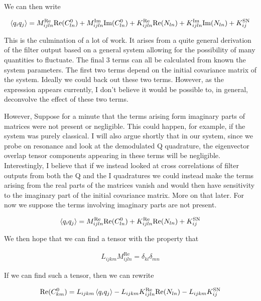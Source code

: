 \documentclass[12pt]{article}
\begin{document}
We can then write

\begin{align}
\Braket{q_iq_j} = M^{\text{Re}}_{ijln} \text{Re}(C^0_{ln}) + M^{\text{Im}}_{ijln} \text{Im}(C^0_{ln}) + K^{\text{Re}}_{ijln} \text{Re}(N_{ln}) + K^{\text{Im}}_{ijln} \text{Im}(N_{ln}) + K^{\text{SN}}_{ij}
\end{align}

This is the culmination of a lot of work. It arises from a quite general derivation of the filter output based on a general system allowing for the possibility of many quantities to fluctuate. The final 3 terms can all be calculated from known the system parameters. The first two terms depend on the initial covariance matrix of the system. Ideally we could back out these two terms. However, as the expression appears currently, I don't believe it would be possible to, in general, deconvolve the effect of these two terms.

However, Suppose for a minute that the terms arising form imaginary parts of matrices were not present or negligible. This could happen, for example, if the system was purely classical. I will also argue shortly that in our system, since we probe on resonance and look at the demodulated Q quadrature, the eigenvector overlap tensor components appearing in these terms will be negligible. Interestingly, I believe that if we instead looked at cross correlations of filter outputs from both the Q and the I quadratures we could instead make the terms arising from the real parts of the matrices vanish and would then have sensitivity to the imaginary part of the initial covariance matrix. More on that later. For now we suppose the terms involving imaginary parts are not present.

\begin{align}
\Braket{q_iq_j} = M^{\text{Re}}_{ijln}\text{Re}(C^0_{ln}) + K^{\text{Re}}_{ijln}\text{Re}(N_{ln}) + K^{\text{SN}}_{ij}
\end{align}

We then hope that we can find a tensor with the property that

\begin{align}
L_{ijkm}M^{\text{Re}}_{ijln} = \delta_{kl}\delta_{mn}
\end{align}

If we can find such a tensor, then we can rewrite

\begin{align}
\text{Re}(C^0_{km}) = L_{ijkm}\Braket{q_iq_j} - L_{ijkm}K^{\text{Re}}_{ijln} \text{Re}(N_{ln}) - L_{ijkm}K^{\text{SN}}_{ij}
\end{align}
\end{document}
